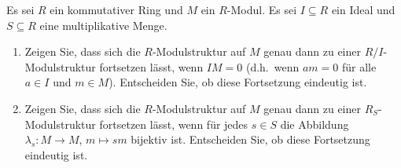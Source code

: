 \begin{question}[subtitle = Moduln über Lokalisierungen und Quotienten]
  \label{question: extension of module structures onto quotients and localizations}
  Es sei $R$ ein kommutativer Ring und $M$ ein $R$-Modul.
  Es sei $I \subseteq R$ ein Ideal und $S \subseteq R$ eine multiplikative Menge.
  \begin{enumerate}
    \item
      Zeigen Sie, dass sich die $R$-Modulstruktur auf $M$ genau dann zu einer $R/I$-Modulstruktur fortsetzen lässt, wenn $IM =  0$ (d.h.\ wenn $am = 0$ für alle $a \in I$ und $m \in M$).
      Entscheiden Sie, ob diese Fortsetzung eindeutig ist.
    \item
      Zeigen Sie, dass sich die $R$-Modulstruktur auf $M$ genau dann zu einer $R_S$-Modulstruktur fortsetzen lässt, wenn für jedes $s \in S$ die Abbildung $\lambda_s \colon M \to M$, $m \mapsto sm$ bijektiv ist.
      Entscheiden Sie, ob diese Fortsetzung eindeutig ist.
  \end{enumerate}
\end{question}



